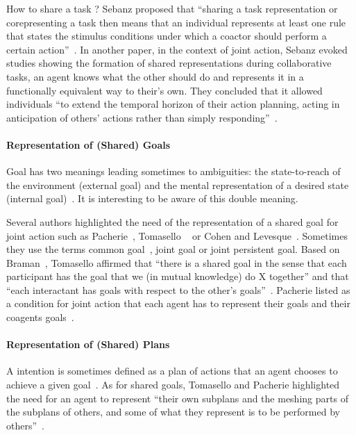 \documentclass[a4paper,11pt,twoside]{StyleThese}
\begin{document}
How to share a task ? Sebanz \etal proposed that ``sharing a task representation or corepresenting a task then means that an individual represents at least one rule that states the stimulus conditions under which a coactor should perform a certain action''~\cite[p.~1235]{sebanz_2005_two}.
In another paper, in the context of joint action, Sebanz \etal{} evoked studies showing the formation of shared representations during collaborative tasks, \ie an agent knows what the other should do and represents it in a functionally equivalent way to their's own. They concluded that it allowed individuals ``to extend the temporal horizon of their action planning,
acting in anticipation of others’ actions rather than simply responding''~\cite[p.~73]{sebanz_2006_joint}.


\paragraph{Representation of (Shared) Goals}
Goal has two meanings leading sometimes to ambiguities: the state-to-reach of the environment (external goal) and the mental representation of a desired state (internal goal)~\cite{tomasello_2005_understanding}. It is interesting to be aware of this double meaning. 

Several authors highlighted the need of the representation of a shared goal for joint action such as Pacherie~\cite{pacherie_2012_agency}, Tomasello \etal{}~\cite{tomasello_2005_understanding} or Cohen and Levesque~\cite{cohen_1991_teamwork}. Sometimes they use the terms  common goal~\cite{searle_1990_collective}, joint goal or joint persistent goal.
Based on Braman~\cite{bratman_1992_coop}, Tomasello \etal{} affirmed that ``there is a shared goal in the sense that each participant has the goal that we (in mutual knowledge) do X together'' and that ``each interactant has goals with respect to the other’s goals''~\cite{tomasello_2005_understanding}. Pacherie listed as a condition for joint action that each agent has to represent their goals and their coagents goals~\cite{pacherie_2012_agency}.

\paragraph{Representation of (Shared) Plans}
A intention is sometimes defined as a plan of actions that an agent chooses to achieve a given goal~\cite{tomasello_2005_understanding, kaplan_2006_challenges}. 
As for shared goals, Tomasello \etal{} and Pacherie highlighted the need for an agent to represent ``their own subplans and the meshing parts of the subplans of others, and some of what they represent is to be performed by others''~\cite[p.~353]{pacherie_2012_agency}.
\end{document}
